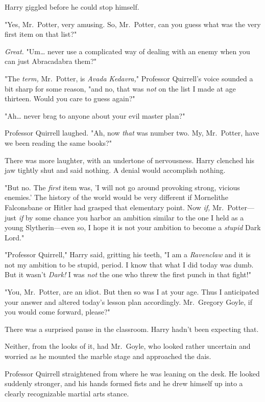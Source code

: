 Harry giggled before he could stop himself.

"Yes, Mr.~Potter, very amusing. So, Mr.~Potter, can you guess what was the very first item on that list?"

\emph{Great.} "Um{\ldots} never use a complicated way of dealing with an enemy when you can just Abracadabra them?"

"The \emph{term,} Mr.~Potter, is \emph{Avada Kedavra,}" Professor Quirrell's voice sounded a bit sharp for some reason, "and no, that was \emph{not} on the list I made at age thirteen. Would you care to guess again?"

"Ah{\ldots} never brag to anyone about your evil master plan?"

Professor Quirrell laughed. "Ah, now \emph{that} was number two. My, Mr.~Potter, have we been reading the same books?"

There was more laughter, with an undertone of nervousness. Harry clenched his jaw tightly shut and said nothing. A denial would accomplish nothing.

"But no. The \emph{first} item was, 'I will not go around provoking strong, vicious enemies.' The history of the world would be very different if Mornelithe Falconsbane or Hitler had grasped that elementary point. Now \emph{if,} Mr.~Potter---just \emph{if} by some chance you harbor an ambition similar to the one I held as a young Slytherin---even so, I hope it is not your ambition to become a \emph{stupid} Dark Lord."

"Professor Quirrell," Harry said, gritting his teeth, "I am a \emph{Ravenclaw} and it is not my ambition to be stupid, period. I know that what I did today was dumb. But it wasn't \emph{Dark!} I was \emph{not} the one who threw the first punch in that fight!"

"You, Mr.~Potter, are an idiot. But then so was I at your age. Thus I anticipated your answer and altered today's lesson plan accordingly. Mr.~Gregory Goyle, if you would come forward, please?"

There was a surprised pause in the classroom. Harry hadn't been expecting that.

Neither, from the looks of it, had Mr.~Goyle, who looked rather uncertain and worried as he mounted the marble stage and approached the dais.

Professor Quirrell straightened from where he was leaning on the desk. He looked suddenly stronger, and his hands formed fists and he drew himself up into a clearly recognizable martial arts stance.

